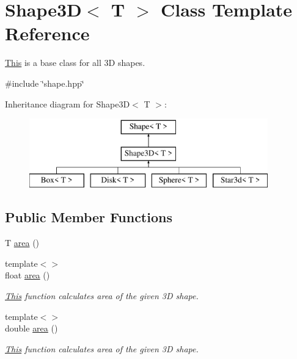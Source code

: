 \hypertarget{classShape3D}{}\section{Shape3D$<$ T $>$ Class Template Reference}
\label{classShape3D}


\mbox{\hyperlink{classThis}{This}} is a base class for all 3D shapes.  




{\ttfamily \#include \char`\"{}shape.\+hpp\char`\"{}}

Inheritance diagram for Shape3D$<$ T $>$\+:\begin{figure}[H]
\begin{center}
\leavevmode
\includegraphics[height=3.000000cm]{classShape3D}
\end{center}
\end{figure}
\subsection*{Public Member Functions}
\begin{DoxyCompactItemize}
\item 
T \mbox{\hyperlink{classShape3D_add8607daa60f43c6cb71e7162c107d71}{area}} ()
\item 
{\footnotesize template$<$$>$ }\\float \mbox{\hyperlink{classShape3D_ae3c7c5cca570561caf09868885bea389}{area}} ()
\begin{DoxyCompactList}\small\item\em \mbox{\hyperlink{classThis}{This}} function calculates area of the given 3D shape. \end{DoxyCompactList}\item 
{\footnotesize template$<$$>$ }\\double \mbox{\hyperlink{classShape3D_a56f028736c84c6eb86f1d56e5a38c40d}{area}} ()
\begin{DoxyCompactList}\small\item\em \mbox{\hyperlink{classThis}{This}} function calculates area of the given 3D shape. \end{DoxyCompactList}\end{DoxyCompactItemize}
